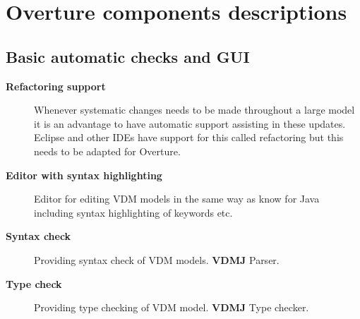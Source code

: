\documentclass[11pt,a4paper,oneside]{report}
\begin{document}
\chapter{Overture components descriptions}


\section{Basic automatic checks and GUI}
\begin{description}
	\item[\textbf{Refactoring support}] Whenever systematic
          changes needs to be made throughout a large model it is an
          advantage to have automatic support assisting in these
          updates. Eclipse and other IDEs have support for this called
          refactoring but this needs to be adapted for Overture.

	\item[\textbf{Editor with syntax highlighting}] Editor for editing VDM models in the same way as know for Java including syntax highlighting of keywords etc.

	\item[\textbf{Syntax check}] Providing syntax check of VDM models. \textbf{VDMJ} Parser.

	\item[\textbf{Type check}] Providing type checking of VDM model. \textbf{VDMJ} Type checker.

\end{description}
\end{document}
